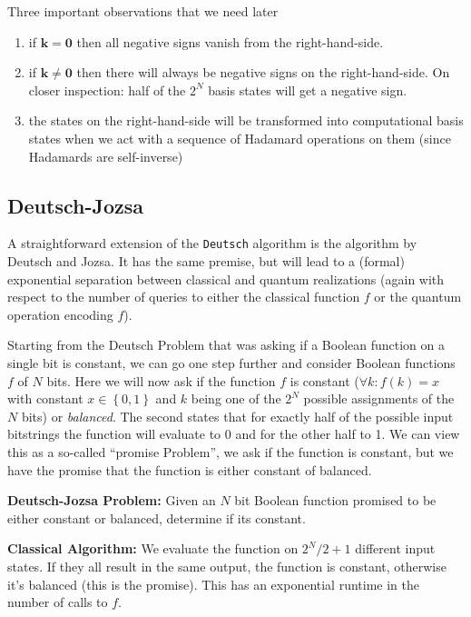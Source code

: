 Three important observations that we need later
\begin{highlight}
\begin{enumerate}
    \item if $\mathbf{k}=\mathbf{0}$ then all negative signs vanish from the right-hand-side.
    \item if $\mathbf{k}\neq\mathbf{0}$ then there will always be negative signs on the right-hand-side. On closer inspection: half of the $2^N$ basis states will get a negative sign.
    \item the states on the right-hand-side will be transformed into computational basis states when we act with a sequence of Hadamard operations on them (since Hadamards are self-inverse)
\end{enumerate}
\end{highlight}
\subsection{Deutsch-Jozsa}
A straightforward extension of the \texttt{Deutsch} algorithm is the algorithm by Deutsch and Jozsa. 
It has the same premise, but will lead to a (formal) exponential separation between classical and quantum realizations (again with respect to the number of queries to either the classical function $f$ or the quantum operation encoding $f$).

Starting from the Deutsch Problem that was asking if a Boolean function on a single bit is constant, we can go one step further and consider Boolean functions $f$ of $N$ bits. 
Here we will now ask if the function $f$ is constant ($\forall k: f(k) = x$ with constant $x\in\left\{0,1\right\}$ and $k$ being one of the $2^N$ possible assignments of the $N$ bits) or \textit{balanced}. The second states that for exactly half of the possible input bitstrings the function will evaluate to 0 and for the other half to 1. We can view this as a so-called ``promise Problem'', we ask if the function is constant, but we have the promise that the function is either constant of balanced.

\begin{def*}
\textbf{Deutsch-Jozsa Problem:} Given an $N$ bit Boolean function promised to be either constant or balanced, determine if its constant.
\end{def*}

\begin{algo*}
\textbf{Classical Algorithm:} We evaluate the function on $2^N/2+1$ different input states. If they all result in the same output, the function is constant, otherwise it's balanced (this is the promise). This has an exponential runtime in the number of calls to $f$.
\end{algo*}


